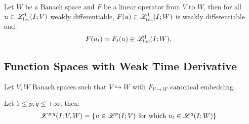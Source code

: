 \begin{lemma}
    Let $W$ be a Banach space and $F$ be a linear operator from $V$ to $W$, then for all $u \in \mathscr{L}^{1}_{loc}(I; V)$ weakly differentiable, $F(u) \in \mathscr{L}^{1}_{loc}(I; W)$ is weakly differentiable and:
    \begin{gather}
        F(u_t) = F_t(u) \in \mathscr{L}^{1}_{loc}(I; W).
    \end{gather}
\end{lemma}

\newpage
\subsection{Function Spaces with Weak Time Derivative}

Let $V, W$ Banach spaces such that $V \hookrightarrow W$ with $F_{V \rightarrow W}$ canonical embedding.

\begin{definition}[$\Xpq{P}{q}(I; V, W)$]
    Let $1 \leq p, q \leq +\infty$, then:
    \begin{gather}
        \mathscr{X}^{p, q}(I; V, W) = \left\{ u \in \mathscr{L}^{p}(I; V) \text{ for which } u_t \in \mathscr{L}^{q}(I; W) \right\}
    \end{gather}
\end{definition}